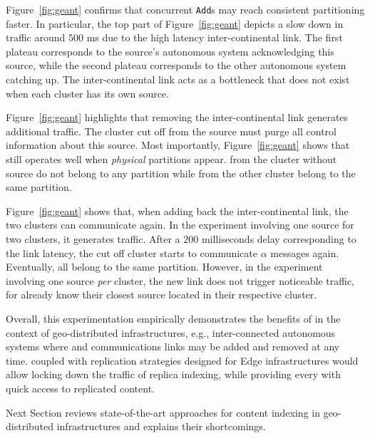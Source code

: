 \begin{asparadesc}
\noindent Figure~\ref{fig:geant} confirms that concurrent
\texttt{Add}s may reach consistent partitioning faster. In particular,
the top part of Figure~\ref{fig:geant} depicts a slow down in traffic
around $500$ ms due to the high latency inter-continental link. The
first plateau corresponds to the source's autonomous system
acknowledging this source, while the second plateau corresponds to the
other autonomous system catching up.  The inter-continental link acts
as a bottleneck that does not exist when each cluster has its own
source.

\noindent Figure~\ref{fig:geant} highlights that removing the
inter-continental link generates additional traffic. The cluster cut
off from the source must purge all control information about this
source.  Most importantly, Figure~\ref{fig:geant} shows that \NAME
still operates well when \emph{physical} partitions appear. \Processes
from the cluster without source do not belong to any partition while
\processes from the other cluster belong to the same partition. 

\noindent Figure~\ref{fig:geant} shows that, when adding back the
inter-continental link, the two clusters can communicate again. In the
experiment involving one source for two clusters, it generates
traffic. After a $200$ milliseconds delay corresponding to the link latency, the
cut off cluster starts to communicate $\alpha$ messages
again. Eventually, all \processes belong to the same
partition. However, in the experiment involving one source \emph{per}
cluster, the new link does not trigger noticeable traffic, for
\processes already know their closest source located in their
respective cluster.

\noindent Overall, this experimentation empirically demonstrates the
benefits of \NAME in the context of geo-distributed infrastructures,
e.g., inter-connected autonomous systems where \processes and
communications links may be added and removed at any time. \NAME
coupled with replication strategies designed for Edge infrastructures
would allow locking down the traffic of replica indexing, while
providing every \process with quick access to replicated content.

\end{asparadesc}

Next Section reviews state-of-the-art approaches for content indexing
in geo-distributed infrastructures and explains their shortcomings.



